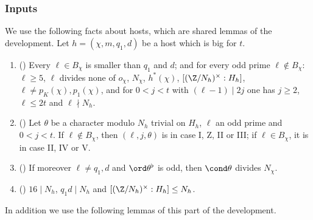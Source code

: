 \subsubsection{Inputs}

We use the following facts about hosts, which are shared lemmas of the development. Let $h=(\chi,m,q_1,d)$ be a host which is
big for $t$.
\begin{enumerate}[label=(H\arabic*)]
\item\label{pf:vwin:H-bchi} () Every $\ell\in B_\chi$ is smaller than $q_1$ and $d$; and for every odd
prime $\ell\notin B_\chi$: $\ell\ge5$, $\ell$ divides none of $o_\chi$, $N_\chi$, $h^*(\chi)$, $[(\Z/N_h)^\times:H_h]$, $\ell\ne p_K(\chi),p_1(\chi)$,
and for $0<j<t$ with $(\ell-1)\mid2j$ one has $j\ge2$, $\ell\le2t$ and $\ell\nmid N_h$.
\item\label{pf:vwin:H-cases} () Let $\theta$ be a character modulo $N_h$ trivial on $H_h$, $\ell$ an
odd prime and $0<j<t$. If $\ell\notin B_\chi$, then $(\ell,j,\theta)$ is in case I, Z, II or III; if $\ell\in B_\chi$, it is in case
II, IV or V.
\item\label{pf:vwin:H-odd} () If moreover $\ell\ne q_1,d$ and $\ord\theta^\flat$ is odd, then
$\cond\theta$ divides $N_\chi$.
\item\label{pf:vwin:H-index} () $16\mid N_h$, $q_1d\mid N_h$ and $[(\Z/N_h)^\times:H_h]\le N_h$.
\end{enumerate}
In addition we use the following lemmas of this part of the development.
